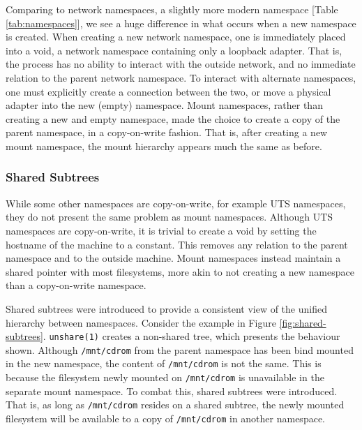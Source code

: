 \documentclass[sigplan]{acmart}
\begin{document}
Comparing to network namespaces, a slightly more modern namespace [Table \ref{tab:namespaces}], we see a huge difference in what occurs when a new namespace is created. When creating a new network namespace, one is immediately placed into a void, a network namespace containing only a loopback adapter. That is, the process has no ability to interact with the outside network, and no immediate relation to the parent network namespace. To interact with alternate namespaces, one must explicitly create a connection between the two, or move a physical adapter into the new (empty) namespace. Mount namespaces, rather than creating a new and empty namespace, made the choice to create a copy of the parent namespace, in a copy-on-write fashion. That is, after creating a new mount namespace, the mount hierarchy appears much the same as before.

\subsubsection{Shared Subtrees}
\label{sec:shared-subtrees}

While some other namespaces are copy-on-write, for example UTS namespaces, they do not present the same problem as mount namespaces. Although UTS namespaces are copy-on-write, it is trivial to create a void by setting the hostname of the machine to a constant. This removes any relation to the parent namespace and to the outside machine. Mount namespaces instead maintain a shared pointer with most filesystems, more akin to not creating a new namespace than a copy-on-write namespace.

Shared subtrees \citep{pai_shared_2005} were introduced to provide a consistent view of the unified hierarchy between namespaces. Consider the example in Figure \ref{fig:shared-subtrees}. \texttt{unshare(1)} creates a non-shared tree, which presents the behaviour shown. Although \texttt{/mnt/cdrom} from the parent namespace has been bind mounted in the new namespace, the content of \texttt{/mnt/cdrom} is not the same. This is because the filesystem newly mounted on \texttt{/mnt/cdrom} is unavailable in the separate mount namespace. To combat this, shared subtrees were introduced. That is, as long as \texttt{/mnt/cdrom} resides on a shared subtree, the newly mounted filesystem will be available to a copy of \texttt{/mnt/cdrom} in another namespace.
\end{document}
